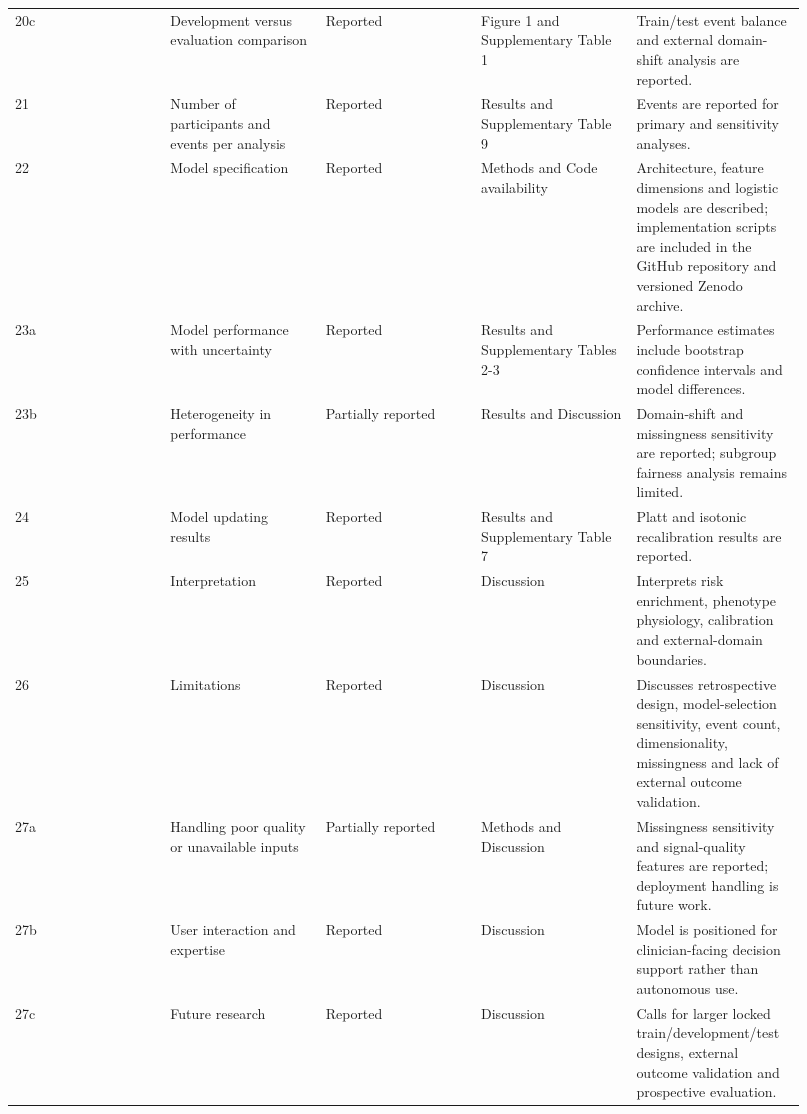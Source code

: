 \documentclass[11pt]{article}
\begin{document}
\begin{landscape}
\begin{longtable}{L{0.184\linewidth} L{0.184\linewidth} L{0.184\linewidth} L{0.184\linewidth} L{0.184\linewidth}}
20c & Development versus evaluation comparison & Reported & Figure 1 and Supplementary Table 1 & Train/\allowbreak{}test event balance and external domain-\allowbreak{}shift analysis are reported.\allowbreak{} \\
21 & Number of participants and events per analysis & Reported & Results and Supplementary Table 9 & Events are reported for primary and sensitivity analyses.\allowbreak{} \\
22 & Model specification & Reported & Methods and Code availability & Architecture, feature dimensions and logistic models are described;\allowbreak{} implementation scripts are included in the GitHub repository and versioned Zenodo archive.\allowbreak{} \\
23a & Model performance with uncertainty & Reported & Results and Supplementary Tables 2-\allowbreak{}3 & Performance estimates include bootstrap confidence intervals and model differences.\allowbreak{} \\
23b & Heterogeneity in performance & Partially reported & Results and Discussion & Domain-\allowbreak{}shift and missingness sensitivity are reported;\allowbreak{} subgroup fairness analysis remains limited.\allowbreak{} \\
24 & Model updating results & Reported & Results and Supplementary Table 7 & Platt and isotonic recalibration results are reported.\allowbreak{} \\
25 & Interpretation & Reported & Discussion & Interprets risk enrichment, phenotype physiology, calibration and external-\allowbreak{}domain boundaries.\allowbreak{} \\
26 & Limitations & Reported & Discussion & Discusses retrospective design, model-\allowbreak{}selection sensitivity, event count, dimensionality, missingness and lack of external outcome validation.\allowbreak{} \\
27a & Handling poor quality or unavailable inputs & Partially reported & Methods and Discussion & Missingness sensitivity and signal-\allowbreak{}quality features are reported;\allowbreak{} deployment handling is future work.\allowbreak{} \\
27b & User interaction and expertise & Reported & Discussion & Model is positioned for clinician-\allowbreak{}facing decision support rather than autonomous use.\allowbreak{} \\
27c & Future research & Reported & Discussion & Calls for larger locked train/\allowbreak{}development/\allowbreak{}test designs, external outcome validation and prospective evaluation.\allowbreak{} \\
\end{longtable}
\normalsize
\end{landscape}
\end{document}
